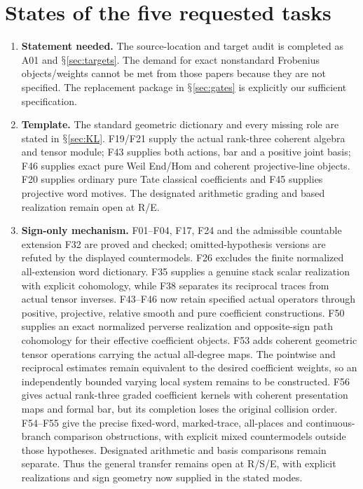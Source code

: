 \documentclass[11pt,a4paper]{article}
\renewcommand{\S}{\ensuremath{\mathsection}}
\theoremstyle{named}\newtheorem{finding}{Finding}[section]
\theoremstyle{definition}\newtheorem{definition}[finding]{Definition}
\theoremstyle{remark}\newtheorem{remark}[finding]{Remark}
\begin{document}
\section{States of the five requested tasks}
\begin{enumerate}
\item \textbf{Statement needed.} The source-location and target audit is completed as A01 and \S\ref{sec:targets}. The demand for exact nonstandard Frobenius objects/weights cannot be met from those papers because they are not specified. The replacement package in \S\ref{sec:gates} is explicitly our sufficient specification.
\item \textbf{Template.} The standard geometric dictionary and every missing role are stated in \S\ref{sec:KL}. F19/F21 supply the actual rank-three coherent algebra and tensor module; F43 supplies both actions, bar and a positive joint basis; F46 supplies exact pure Weil End/Hom and coherent projective-line objects. F20 supplies ordinary pure Tate classical coefficients and F45 supplies projective word motives. The designated arithmetic grading and based realization remain open at R/E.
\item \textbf{Sign-only mechanism.} F01--F04, F17, F24 and the admissible countable extension F32 are proved and checked; omitted-hypothesis versions are refuted by the displayed countermodels. F26 excludes the finite normalized all-extension word dictionary. F35 supplies a genuine stack scalar realization with explicit cohomology, while F38 separates its reciprocal traces from actual tensor inverses. F43--F46 now retain specified actual operators through positive, projective, relative smooth and pure coefficient constructions. F50 supplies an exact normalized perverse realization and opposite-sign path cohomology for their effective coefficient objects. F53 adds coherent geometric tensor operations carrying the actual all-degree maps. The pointwise and reciprocal estimates remain equivalent to the desired coefficient weights, so an independently bounded varying local system remains to be constructed. F56 gives actual rank-three graded coefficient kernels with coherent presentation maps and formal bar, but its completion loses the original collision order. F54--F55 give the precise fixed-word, marked-trace, all-places and continuous-branch comparison obstructions, with explicit mixed countermodels outside those hypotheses. Designated arithmetic and basis comparisons remain separate. Thus the general transfer remains open at R/S/E, with explicit realizations and sign geometry now supplied in the stated modes.

\end{enumerate}
\end{document}
